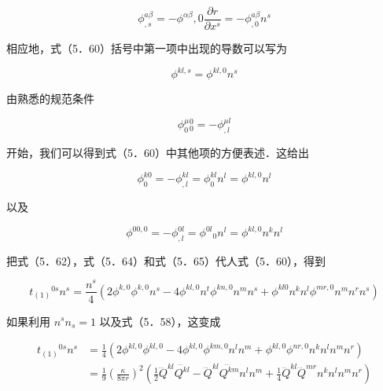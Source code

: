 \begin{equation*}
	\phi_{, s}^{a \beta}=-\phi^{\alpha \beta}, 0 \frac{\partial r}{\partial x^{s}}=-\phi_{, 0}^{a \beta} n^{s} \tag{5.61}
\end{equation*}


相应地，式（5．60）括号中第一项中出现的导数可以写为


\begin{equation*}
	\phi^{k l, s}=\phi^{k l, 0} n^{s} \tag{5.62}
\end{equation*}


由熟悉的规范条件


\begin{equation*}
	\phi_{0}^{\mu}{ }_{0}^{0}=-\phi_{, l}^{\mu l} \tag{5.63}
\end{equation*}


开始，我们可以得到式（5．60）中其他项的方便表述．这给出


\begin{equation*}
	\phi_{0}^{k 0}=-\phi_{, l}^{k l}=\phi_{0}^{k l} n^{l}=\phi^{k l, 0} n^{l} \tag{5.64}
\end{equation*}


以及


\begin{equation*}
	\phi^{00,0}=-\phi_{, l}^{0 l}=\phi^{0 l}{ }_{0} n^{l}=\phi^{k l, 0} n^{k} n^{l} \tag{5.65}
\end{equation*}


把式（5．62），式（5．64）和式（5．65）代人式（5．60），得到


\begin{equation*}
	t_{(1)}{ }^{0 s} n^{s}=\frac{n^{s}}{4}\left(2 \phi^{k, 0} \phi^{k, 0} n^{s}-4 \phi^{k l, 0} n^{t} \phi^{k n, 0} n^{m} n^{s}+\phi^{k l 0} n^{k} n^{l} \phi^{m r, 0} n^{m} n^{r} n^{s}\right) \tag{5.66}
\end{equation*}


如果利用 $n^{s} n_{s}=1$ 以及式（5．58），这变成


\begin{align*}
	t_{(1)}{ }^{0 s} n^{s} & =\frac{1}{4}\left(2 \phi^{k l, 0} \phi^{k l, 0}-4 \phi^{k l, 0} \phi^{k m, 0} n^{l} n^{m}+\phi^{k l, 0} \phi^{n r, 0} n^{k} n^{l} n^{m} n^{r}\right) \\
	& =\frac{1}{9}\left(\frac{\kappa}{8 \pi r}\right)^{2}\left(\frac{1}{2} \dddot{Q}^{k l} \dddot{Q^{k l}}-\dddot{Q}^{k l} \dddot{Q^{k m}} n^{l} n^{m}+\frac{1}{4} \dddot{Q}^{k l} \dddot{Q}^{m r} n^{k} n^{l} n^{m} n^{r}\right) \tag{5.67}
\end{align*}



